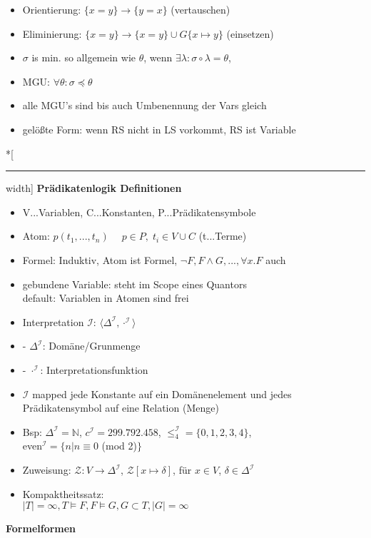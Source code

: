 \documentclass[12pt,a4paper]{article}
\begin{document}
\begin{paracol}{3}
\begin{itemize}
\item Orientierung: $\{x=y\} \rightarrow \{y=x\}$ (vertauschen)
\item Eliminierung: $\{x=y\} \rightarrow \{x=y\} \cup G\{x\mapsto y\}$ (einsetzen)
\item $\sigma$ is min. so allgemein wie $\theta$, wenn $\exists \lambda: \sigma \circ \lambda = \theta$,
\item MGU: $\forall \theta: \sigma \preceq \theta$
\item alle MGU's sind bis auch Umbenennung der Vars gleich
\item gelößte Form: wenn RS nicht in LS vorkommt, RS ist Variable
\end{itemize}
\switchcolumn[0]*[\hrule width\textwidth]
\centering
\textbf{Prädikatenlogik Definitionen}
\flushleft
\begin{itemize}
\setlength\itemsep{-0.5em}
\item V...Variablen, C...Konstanten, P...Prädikatensymbole
\item Atom: $p(t_1,...,t_n)\;\quad p\in P,\; t_i\in V\cup C$ (t...Terme)
\item Formel: Induktiv, Atom ist Formel, $\lnot F, F\land G,..., \forall x.F$ auch
\item gebundene Variable: steht im Scope eines Quantors\\default: Variablen in Atomen sind frei
\item Interpretation $\mathcal{I}$: $\langle \Delta^\mathcal{I}, \cdot^\mathcal{I} \rangle$
\item -  $\Delta^\mathcal{I}$: Domäne/Grunmenge
\item -  $\cdot^\mathcal{I}$: Interpretationsfunktion
\item $\mathcal{I}$ mapped jede Konstante auf ein Domänenelement und jedes Prädikatensymbol auf eine Relation (Menge)
\item Bsp: $\Delta^\mathcal{I} = \mathbb{N}$, $c^\mathcal{I}=299.792.458$, $\leq_4^\mathcal{I} = \{0,1,2,3,4\}$,\\even$^\mathcal{I} = \{n|n \equiv 0 $ (mod 2)$\}$
\item Zuweisung: $\mathcal{Z}: V \rightarrow \Delta^\mathcal{I}$, $\mathcal{Z}[x\mapsto \delta]$, für $x\in V$, $\delta \in \Delta^\mathcal{I}$
\item Kompaktheitssatz:\\$|T|=\infty, T\models F, F\models G, G\subset T, |G|=\infty$
\end{itemize}
\switchcolumn[1]
\centering
\textbf{Formelformen}
\flushleft
\begin{itemize}

\end{itemize}
\end{paracol}
\end{document}

